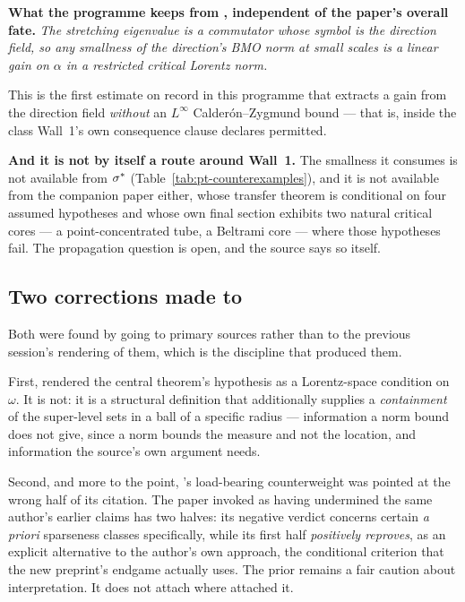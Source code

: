 \begin{record}
\textbf{What the programme keeps from , independent of the paper's
overall fate.} \emph{The stretching eigenvalue is a commutator whose symbol is
the direction field, so any smallness of the direction's \textup{BMO} norm at
small scales is a linear gain on \(\alpha\) in a restricted critical Lorentz
norm.}

\smallskip
This is the first estimate on record in this programme that extracts a gain
from the direction field \emph{without} an \(L^\infty\) Calder\'on--Zygmund
bound --- that is, inside the class Wall~1's own consequence clause declares
permitted.

\smallskip
\textbf{And it is not by itself a route around Wall~1.} The smallness it
consumes is not available from \(\sigma^{*}\) (Table~\ref{tab:pt-counterexamples}),
and it is not available from the companion paper either, whose transfer theorem
is conditional on four assumed hypotheses and whose own final section exhibits
two natural critical cores --- a point-concentrated tube, a Beltrami core ---
where those hypotheses fail. The propagation question is open, and the source
says so itself.
\end{record}

\subsection{Two corrections \texorpdfstring{}{S57} made to \texorpdfstring{}{S56}}

Both were found by going to primary sources rather than to the previous
session's rendering of them, which is the discipline that produced them.

First,  rendered the central theorem's hypothesis as a Lorentz-space
condition on \(\omega\). It is not: it is a structural definition that
additionally supplies a \emph{containment} of the super-level sets in a ball of
a specific radius --- information a norm bound does not give, since a norm
bounds the measure and not the location, and information the source's own
argument needs.

Second, and more to the point, 's load-bearing counterweight was pointed
at the wrong half of its citation. The paper  invoked as having
undermined the same author's earlier claims has two halves: its negative verdict
concerns certain \emph{a priori} sparseness classes specifically, while its
first half \emph{positively reproves}, as an explicit alternative to the
author's own approach, the conditional criterion that the new preprint's endgame
actually uses. The prior remains a fair caution about interpretation. It does
not attach where  attached it.

